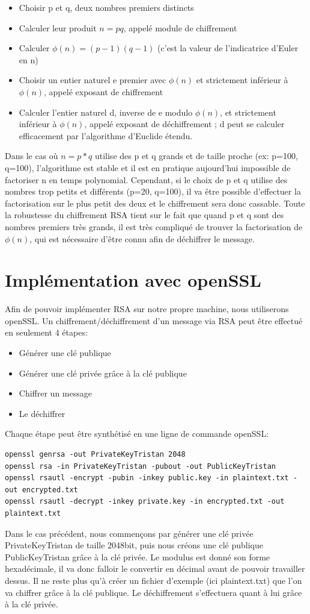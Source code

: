 \documentclass[12pt, oneside]{article}
\begin{document}
\begin{itemize}
\item Choisir p et q, deux nombres premiers distincts
\item Calculer leur produit \(n = pq\), appelé module de chiffrement
\item Calculer \(\phi(n) = (p - 1)(q - 1)\) (c'est la valeur de l'indicatrice d'Euler en n)
\item Choisir un entier naturel e premier avec \(\phi(n)\) et strictement inférieur à \(\phi(n)\), appelé exposant de chiffrement
\item Calculer l'entier naturel d, inverse de e modulo \(\phi(n)\), et strictement inférieur à \(\phi(n)\), appelé exposant de déchiffrement ; d peut se calculer efficacement par l'algorithme d'Euclide étendu.\\
\end{itemize}
Dans le cas où \( n=p*q\) utilise des p et q grands et de taille proche (ex: p=100, q=100), l'algorithme est stable et il est en pratique aujourd'hui impossible de factoriser n en temps polynomial. Cependant, si le choix de p et q utilise des nombres trop petits et différents (p=20, q=100), il va être possible d'effectuer la factorisation sur le plus petit des deux et le chiffrement sera donc cassable. Toute la robustesse du chiffrement RSA tient sur le fait que quand p et q sont des nombres premiers très grands, il est très compliqué de trouver la factorisation de \(\phi(n)\), qui est nécessaire d'être connu afin de déchiffrer le message.

\section{Implémentation avec openSSL}
Afin de pouvoir implémenter RSA sur notre propre machine, nous utiliserons openSSL. Un chiffrement/déchiffrement d'un message via RSA peut être effectué en seulement 4 étapes:
\begin{itemize}
\item Générer une clé publique
\item Générer une clé privée grâce à la clé publique
\item Chiffrer un message
\item Le déchiffrer
\end{itemize}
Chaque étape peut être synthétisé en une ligne de commande openSSL:
\begin{verbatim}
openssl genrsa -out PrivateKeyTristan 2048
openssl rsa -in PrivateKeyTristan -pubout -out PublicKeyTristan
openssl rsautl -encrypt -pubin -inkey public.key -in plaintext.txt -out encrypted.txt
openssl rsautl -decrypt -inkey private.key -in encrypted.txt -out plaintext.txt
\end{verbatim}
Dans le cas précédent, nous commençons par générer une clé privée PrivateKeyTristan de taille 2048bit, puis nous créons une clé publique PublicKeyTristan grâce à la clé privée. Le modulus est donné son forme hexadécimale, il va donc falloir le convertir en décimal avant de pouvoir travailler dessus. Il ne reste plus qu'à créer un fichier d'exemple (ici plaintext.txt) que l'on va chiffrer grâce à la clé publique. Le déchiffrement s'effectuera quant à lui grâce à la clé privée. 
\end{document}
